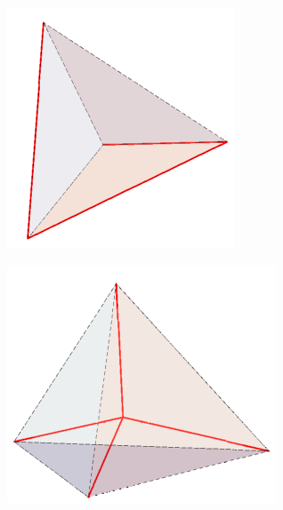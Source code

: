 \documentclass[b1paper,portrait]{template/baposter}
\begin{document}
\begin{poster}
{\begin{center}
	 	\begin{minipage}{0.25\linewidth}
			\includegraphics[width=\linewidth]{Put1}
		\end{minipage}
		\hspace{30pt}
	 	\begin{minipage}{0.25\linewidth}
			\includegraphics[width=\linewidth]{Put4}
		\end{minipage}
	\end{center}
	 \vspace{0.10cm}
}




\end{poster}
\end{document}
